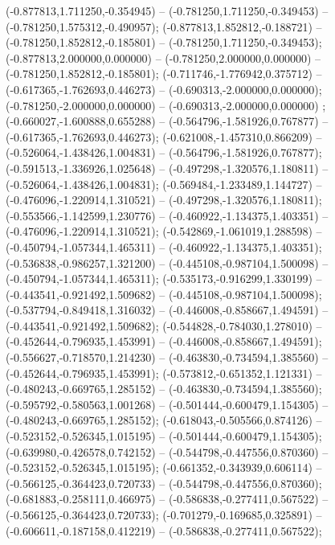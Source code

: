  (-0.877813,1.711250,-0.354945) -- (-0.781250,1.711250,-0.349453) -- (-0.781250,1.575312,-0.490957);
 (-0.877813,1.852812,-0.188721) -- (-0.781250,1.852812,-0.185801) -- (-0.781250,1.711250,-0.349453);
 (-0.877813,2.000000,0.000000) -- (-0.781250,2.000000,0.000000) -- (-0.781250,1.852812,-0.185801);
 (-0.711746,-1.776942,0.375712) -- (-0.617365,-1.762693,0.446273) -- (-0.690313,-2.000000,0.000000);
 (-0.781250,-2.000000,0.000000) -- (-0.690313,-2.000000,0.000000) ;
 (-0.660027,-1.600888,0.655288) -- (-0.564796,-1.581926,0.767877) -- (-0.617365,-1.762693,0.446273);
 (-0.621008,-1.457310,0.866209) -- (-0.526064,-1.438426,1.004831) -- (-0.564796,-1.581926,0.767877);
 (-0.591513,-1.336926,1.025648) -- (-0.497298,-1.320576,1.180811) -- (-0.526064,-1.438426,1.004831);
 (-0.569484,-1.233489,1.144727) -- (-0.476096,-1.220914,1.310521) -- (-0.497298,-1.320576,1.180811);
 (-0.553566,-1.142599,1.230776) -- (-0.460922,-1.134375,1.403351) -- (-0.476096,-1.220914,1.310521);
 (-0.542869,-1.061019,1.288598) -- (-0.450794,-1.057344,1.465311) -- (-0.460922,-1.134375,1.403351);
 (-0.536838,-0.986257,1.321200) -- (-0.445108,-0.987104,1.500098) -- (-0.450794,-1.057344,1.465311);
 (-0.535173,-0.916299,1.330199) -- (-0.443541,-0.921492,1.509682) -- (-0.445108,-0.987104,1.500098);
 (-0.537794,-0.849418,1.316032) -- (-0.446008,-0.858667,1.494591) -- (-0.443541,-0.921492,1.509682);
 (-0.544828,-0.784030,1.278010) -- (-0.452644,-0.796935,1.453991) -- (-0.446008,-0.858667,1.494591);
 (-0.556627,-0.718570,1.214230) -- (-0.463830,-0.734594,1.385560) -- (-0.452644,-0.796935,1.453991);
 (-0.573812,-0.651352,1.121331) -- (-0.480243,-0.669765,1.285152) -- (-0.463830,-0.734594,1.385560);
 (-0.595792,-0.580563,1.001268) -- (-0.501444,-0.600479,1.154305) -- (-0.480243,-0.669765,1.285152);
 (-0.618043,-0.505566,0.874126) -- (-0.523152,-0.526345,1.015195) -- (-0.501444,-0.600479,1.154305);
 (-0.639980,-0.426578,0.742152) -- (-0.544798,-0.447556,0.870360) -- (-0.523152,-0.526345,1.015195);
 (-0.661352,-0.343939,0.606114) -- (-0.566125,-0.364423,0.720733) -- (-0.544798,-0.447556,0.870360);
 (-0.681883,-0.258111,0.466975) -- (-0.586838,-0.277411,0.567522) -- (-0.566125,-0.364423,0.720733);
 (-0.701279,-0.169685,0.325891) -- (-0.606611,-0.187158,0.412219) -- (-0.586838,-0.277411,0.567522);
